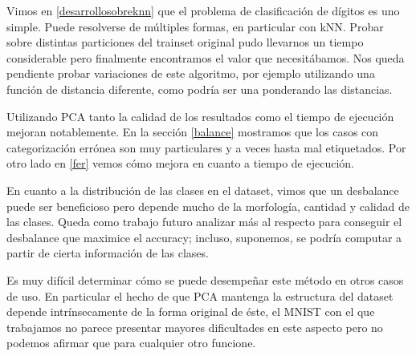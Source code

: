 Vimos en \ref{desarrollosobreknn} que el problema de clasificación de dígitos es uno simple. Puede resolverse de múltiples formas, en particular con kNN. Probar sobre distintas particiones del trainset original pudo llevarnos un tiempo considerable pero finalmente encontramos el valor que necesitábamos. Nos queda pendiente probar variaciones de este algoritmo, por ejemplo utilizando una función de distancia diferente, como podría ser una ponderando las distancias.

Utilizando PCA tanto la calidad de los resultados como el tiempo de ejecución mejoran notablemente. En la sección \ref{balance} mostramos que los casos con categorización errónea son muy particulares y a veces hasta mal etiquetados. Por otro lado en \ref{fer} vemos cómo mejora en cuanto a tiempo de ejecución.

En cuanto a la distribución de las clases en el dataset, vimos que un desbalance puede ser beneficioso pero depende mucho de la morfología, cantidad y calidad de las clases. Queda como trabajo futuro analizar más al respecto para conseguir el desbalance que maximice el accuracy; incluso, suponemos, se podría computar a partir de cierta información de las clases.

Es muy difícil determinar cómo se puede desempeñar este método en otros casos de uso. En particular el hecho de que PCA mantenga la estructura del dataset depende intrínsecamente de la forma original de éste, el MNIST con el que trabajamos no parece presentar mayores dificultades en este aspecto pero no podemos afirmar que para cualquier otro funcione. 
